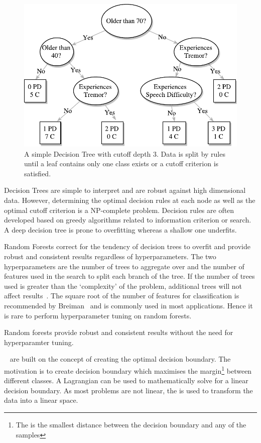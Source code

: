 \documentclass[12pt, twoside]{book}
\renewcommand\emph[1]{\textit{\color{USred}{#1}}}
\begin{document}
\begin{figure}[h]
\centering\includegraphics[width=0.8\linewidth]{decisiontree.pdf}
\caption{A simple Decision Tree with cutoff depth 3. Data is split by rules until a leaf contains only one class exists or a cutoff criterion is satisfied.}
\label{decisiontree}
\end{figure}

Decision Trees are simple to interpret and are robust against high dimensional data. However, determining the optimal decision rules at each node as well as the optimal cutoff criterion is a NP-complete problem. Decision rules are often developed based on greedy algorithms related to information criterion or search. A deep decision tree is prone to overfitting whereas a shallow one underfits.

Random Forests correct for the tendency of decision trees to overfit and provide robust and consistent results regardless of hyperparameters. The two hyperparameters are the number of trees to aggregate over and the number of features used in the search to split each branch of the tree. If the number of trees used is greater than the `complexity' of the problem, additional trees will not affect results~\cite{treesinaforest}. The square root of the number of features for classification is recommended by Breiman~\cite{randomforests} and is commonly used in most applications. Hence it is rare to perform hyperparameter tuning on random forests.

\begin{highlight}
Random forests provide robust and consistent results without the need for hyperparamter tuning.
\end{highlight}

\emph{Support Vector Machines}~\cite{svm} are built on the concept of creating the optimal decision boundary. The motivation is to create decision boundary which maximises the margin\footnote{The \emph{margin} is the smallest distance between the decision boundary and any of the samples} between different classes. A Lagrangian can be used to mathematically solve for a linear decision boundary. As most problems are not linear, the \emph{kernel trick} is used to transform the data into a linear space.
\end{document}

